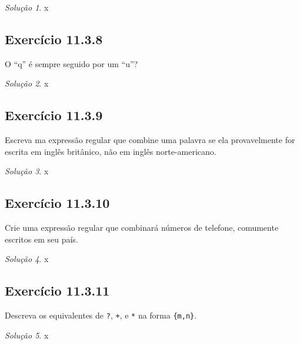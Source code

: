\documentclass[
]{latex/krantz}
\theoremstyle{definition}
\theoremstyle{definition}
\theoremstyle{definition}
\theoremstyle{definition}
\theoremstyle{remark}
\newtheorem*{solution}{Solução}
\begin{document}
\begin{solution}
x
\end{solution}

\hypertarget{exr11-3-8}{%
\subsection*{Exercício 11.3.8}\label{exr11-3-8}}

O ``q'' é sempre seguido por um ``u''?

\begin{solution}
x
\end{solution}

\hypertarget{exr11-3-9}{%
\subsection*{Exercício 11.3.9}\label{exr11-3-9}}

Escreva ma expressão regular que combine uma palavra se ela provavelmente for escrita em inglês britânico, não em inglês norte-americano.

\begin{solution}
x
\end{solution}

\hypertarget{exr11-3-10}{%
\subsection*{Exercício 11.3.10}\label{exr11-3-10}}

Crie uma expressão regular que combinará números de telefone, comumente escritos em seu país.

\begin{solution}
x
\end{solution}

\hypertarget{exr11-3-11}{%
\subsection*{Exercício 11.3.11}\label{exr11-3-11}}

Descreva os equivalentes de \texttt{?}, \texttt{+}, e \texttt{*} na forma \texttt{\{m,n\}}.

\begin{solution}
x
\end{solution}
\end{document}
